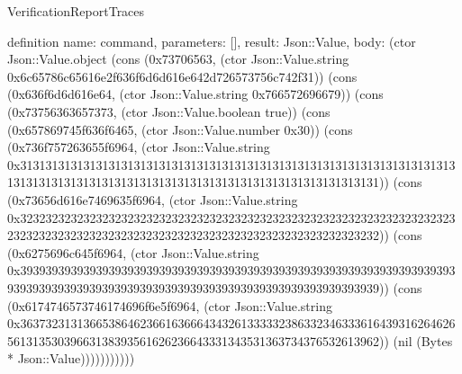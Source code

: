 \begin{lexlean}{VerificationReportTraces}
\begin{semanticmodule}
definition{
  name: command,
  parameters: [],
  result: Json::Value,
  body: (ctor Json::Value.object (cons (0x73706563, (ctor Json::Value.string 0x6c65786c65616e2f636f6d6d616e642d726573756c742f31)) (cons (0x636f6d6d616e64, (ctor Json::Value.string 0x766572696679)) (cons (0x73756363657373, (ctor Json::Value.boolean true)) (cons (0x657869745f636f6465, (ctor Json::Value.number 0x30)) (cons (0x736f757263655f6964, (ctor Json::Value.string 0x31313131313131313131313131313131313131313131313131313131313131313131313131313131313131313131313131313131313131313131313131313131)) (cons (0x73656d616e7469635f6964, (ctor Json::Value.string 0x32323232323232323232323232323232323232323232323232323232323232323232323232323232323232323232323232323232323232323232323232323232)) (cons (0x6275696c645f6964, (ctor Json::Value.string 0x39393939393939393939393939393939393939393939393939393939393939393939393939393939393939393939393939393939393939393939393939393939)) (cons (0x6174746573746174696f6e5f6964, (ctor Json::Value.string 0x36373231313665386462366163666434326133333238633234633361643931626462656131353039663138393561626236643331343531363734376532613962)) (nil (Bytes * Json::Value)))))))))))
}


\end{semanticmodule}
\end{lexlean}
